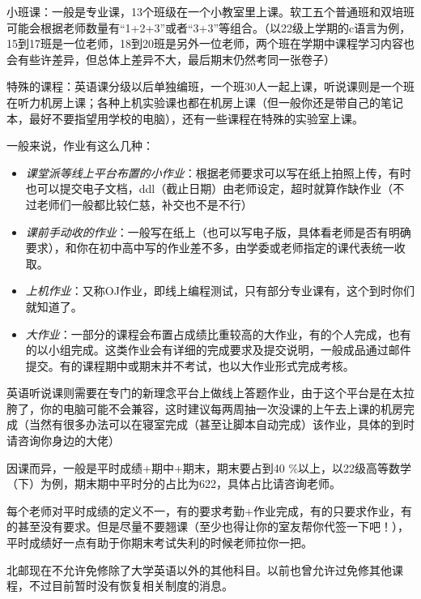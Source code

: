 小班课：一般是专业课，1\-3个班级在一个小教室里上课。软工五个普通班和双培班可能会根据老师数量有“1+2+3”或者“3+3”等组合。（以22级上学期的c语言为例，15到17班是一位老师，18到20班是另外一位老师，两个班在学期中课程学习内容也会有些许差异，但总体上差异不大，最后期末仍然考同一张卷子）

特殊的课程：英语课分级以后单独编班，一个班30人一起上课，听说课则是一个班在听力机房上课；各种上机实验课也都在机房上课（但一般你还是带自己的笔记本，最好不要指望用学校的电脑），还有一些课程在特殊的实验室上课。


一般来说，作业有这么几种：

\begin{itemize}
    \itshape
    \item \emph{课堂派等线上平台布置的小作业}：根据老师要求可以写在纸上拍照上传，有时也可以提交电子文档，ddl（截止日期）由老师设定，超时就算作缺作业（不过老师们一般都比较仁慈，补交也不是不行）
    \item \emph{课前手动收的作业}：一般写在纸上（也可以写电子版，具体看老师是否有明确要求），和你在初中高中写的作业差不多，由学委或老师指定的课代表统一收取。
    \item \emph{上机作业}：又称OJ作业，即线上编程测试，只有部分专业课有，这个到时你们就知道了。
    \item \emph{大作业}：一部分的课程会布置占成绩比重较高的大作业，有的个人完成，也有的以小组完成。这类作业会有详细的完成要求及提交说明，一般成品通过邮件提交。有的课程期中或期末并不考试，也以大作业形式完成考核。
\end{itemize}

英语听说课则需要在专门的新理念平台上做线上答题作业，由于这个平台是在太拉胯了，你的电脑可能不会兼容，这时建议每两周抽一次没课的上午去上课的机房完成（当然有很多办法可以在寝室完成（甚至让脚本自动完成）该作业，具体的到时请咨询你身边的大佬）


因课而异，一般是平时成绩+期中+期末，期末要占到40 \%以上，以22级高等数学（下）为例，期末期中平时分的占比为622，具体占比请咨询老师。

每个老师对平时成绩的定义不一，有的要求考勤+作业完成，有的只要求作业，有的甚至没有要求。但是尽量不要翘课（至少也得让你的室友帮你代签一下吧！），平时成绩好一点有助于你期末考试失利的时候老师拉你一把。


北邮现在不允许免修除了大学英语以外的其他科目。以前也曾允许过免修其他课程，不过目前暂时没有恢复相关制度的消息。

